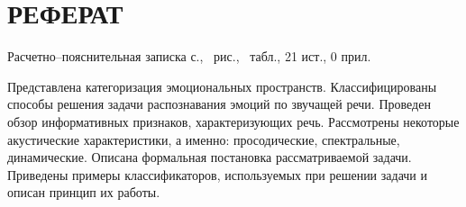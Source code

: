 \chapter*{РЕФЕРАТ}

Расчетно--пояснительная записка \pageref{LastPage} с., \totalfigures\ рис., \totaltables\ табл., 21 ист., 0 прил.

Представлена категоризация эмоциональных пространств. Классифицированы способы решения задачи распознавания эмоций по звучащей речи. Проведен обзор информативных признаков, характеризующих речь. Рассмотрены некоторые акустические характеристики, а именно: просодические, спектральные, динамические. Описана формальная постановка рассматриваемой задачи. Приведены примеры классификаторов, используемых при решении задачи и описан принцип их работы.